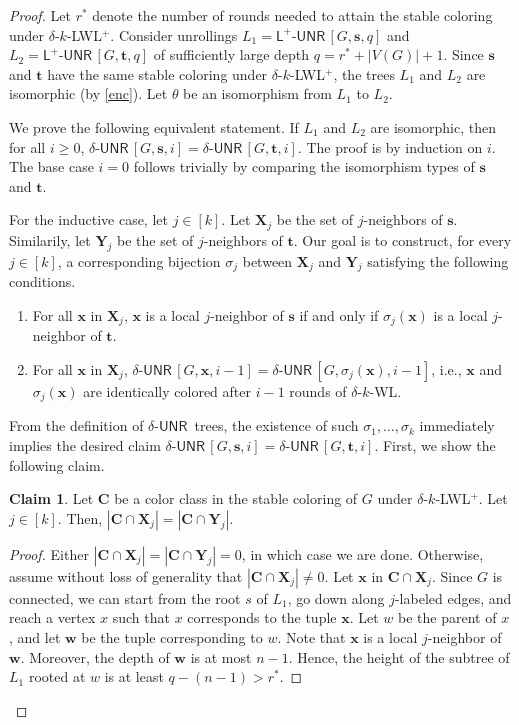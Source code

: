 \documentclass{article}
\theoremstyle{definition}
\renewcommand{\vec}[1]{\mathbf{#1}}
\newcommand{\deltakwl}{$\delta$-$k$-\textsf{WL}\xspace}
\newcommand{\pluskwl}{$\delta$-$k$-\textsf{LWL}$^+$\xspace}
\newcommand{\UNR}{\textsf{UNR}\,}
\newtheorem{claim}[theorem]{Claim}
\newcommand{\deltaunr}{\delta\text{-}\UNR\xspace}
\newcommand{\plusunr}{\textsf{L}^{\!+}\text{-}\UNR\xspace}
\begin{document}
\begin{proof}  
	Let $r^*$ denote the number of rounds needed to attain the stable coloring under \pluskwl. Consider unrollings $L_1 = \plusunr[G,\vec{s},{q}]$ and $L_2 = \plusunr[G,\vec{t},{q}]$ of sufficiently large depth $q = r^* + |V(G)| +1 $. Since $\vec{s}$ and $\vec{t}$ have the same stable coloring under \pluskwl, the trees $L_1$ and $L_2$ are isomorphic (by \cref{enc}). Let $\theta$ be an isomorphism from $L_1$ to $L_2$. 
	
	We prove the following equivalent statement. If $L_1$ and $L_2$ are isomorphic, then for all $i \geq 0$, $\deltaunr[G,\vec{s},i] = \deltaunr[G,\vec{t},i]$.
	The proof is by induction on $i$. The base case $i = 0$ follows trivially by comparing the isomorphism types of $\vec{s}$ and $\vec{t}$. 
	
	For the inductive case, let $j \in [k]$. Let $\vec{X}_j$ be the set of $j$-neighbors of $\vec{s}$. Similarily, let $\vec{Y}_j$ be the set of $j$-neighbors of $\vec{t}$. Our goal is to construct, for every $j \in [k]$, a corresponding bijection $\sigma_j$ between $\vec{X}_j$ and $\vec{Y}_j$ satisfying the following conditions.
	
	\begin{enumerate}
		\item For all $\vec{x}$ in $\vec{X}_j$, $\vec{x}$ is a local $j$-neighbor of $\vec{s}$ if and only if $\sigma_j(\vec{x})$ is a local $j$-neighbor of $\vec{t}$. 
		\item For all $\vec{x}$ in $\vec{X}_j$, $\deltaunr[G,\vec{x},i-1] = \deltaunr[G,\sigma_j(\vec{x}),i-1]$, i.e., $\vec{x}$ and $\sigma_j(\vec{x})$ are identically colored after $i-1$ rounds of \deltakwl.
	\end{enumerate} 
	
	From the definition of $\deltaunr$ trees, the existence of such $\sigma_1,\dots,\sigma_k$ immediately implies the desired claim $\deltaunr[G,\vec{s},i] = \deltaunr[G,\vec{t},i]$. First, we show the following claim. 
	
	\begin{claim}
		Let $\vec{C}$ be a color class in the stable coloring of $G$ under \pluskwl. 
		Let $j \in [k]$. Then, $|\vec{C} \cap \vec{X}_j| = |\vec{C} \cap \vec{Y}_j|$.
	\end{claim}
	
	\begin{proof}
		Either $|\vec{C} \cap \vec{X}_j| = |\vec{C} \cap \vec{Y}_j|= 0$, in which case we are done. Otherwise, assume without loss of generality that $|\vec{C} \cap \vec{X}_j| \neq 0$. Let $\vec{x}$ in $\vec{C} \cap \vec{X}_j$. Since $G$ is connected, we can start from the root $s$ of $L_1$, go down along $j$-labeled edges, and reach a vertex $x$ such that $x$ corresponds to the tuple $\vec{x}$. Let $w$ be the parent of $x$, and let $\vec{w}$ be the tuple corresponding to $w$. Note that $\vec{x}$ is a local $j$-neighbor of $\vec{w}$. Moreover, the depth of $\vec{w}$ is at most $n-1$. Hence, the height of the subtree of $L_1$ rooted at $w$ is at least $q - (n-1) > r^*$.  
		

\end{proof}
\end{proof}
\end{document}
